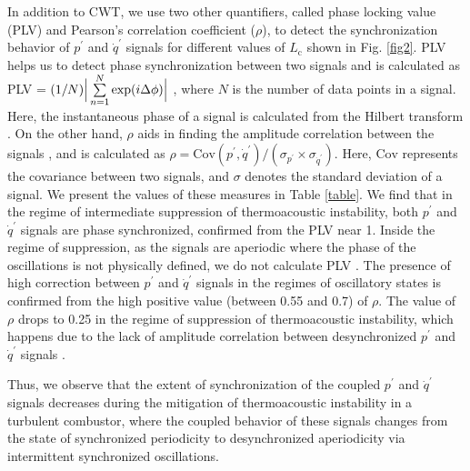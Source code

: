 \documentclass[twocolumn,10pt]{article} %
\begin{document}
In addition to CWT, we use two other quantifiers, called phase locking value (PLV) and Pearson's correlation coefficient ($\rho$), to detect the synchronization behavior of $p^{\prime}$ and $\dot{q}^{\prime}$ signals for different values of $L_{\text{c}}$ shown in Fig. \ref{fig2}. PLV helps us to detect phase synchronization between two signals and is calculated as PLV = $(1/N) \Big{\lvert} \sum\limits_{n=1}^N \text{exp}(i \Delta \phi) \Big{\lvert}$ \cite{pikovsky2003synchronization}, where $N$ is the number of data points in a signal. Here, the instantaneous phase of a signal is calculated from the Hilbert transform \cite{pikovsky2003synchronization}. On the other hand, $\rho$ aids in finding the amplitude correlation between the signals \cite{gonzalez2002amplitude}, and is calculated as $\rho = \text{Cov}(p^{\prime},\dot{q}^{\prime})/(\sigma_{p^{\prime}} \times \sigma_{\dot{q}^{\prime}})$. Here, $\text{Cov}$ represents the covariance between two signals, and $\sigma$ denotes the standard deviation of a signal. We present the values of these measures in Table \ref{table}. We find that in the regime of intermediate suppression of thermoacoustic instability, both $p^{\prime}$ and $\dot{q}^{\prime}$ signals are phase synchronized, confirmed from the PLV near 1. Inside the regime of suppression, as the signals are aperiodic where the phase of the oscillations is not physically defined, we do not calculate PLV \cite{pikovsky2003synchronization,sujith2021thermoacoustic}. The presence of high correction between $p^{\prime}$ and $\dot{q}^{\prime}$ signals  in the regimes of oscillatory states is confirmed from the high positive value (between 0.55 and 0.7) of $\rho$. The value of $\rho$ drops to 0.25 in the regime of suppression of thermoacoustic instability, which happens due to the lack of amplitude correlation between desynchronized $p^{\prime}$ and $\dot{q}^{\prime}$ signals \cite{pawar2017thermoacoustic}.   

Thus, we observe that the extent of synchronization of the coupled $p^{\prime}$ and $\dot{q}^{\prime}$ signals decreases during the mitigation of thermoacoustic instability in a turbulent combustor, where the coupled behavior of these signals changes from the state of synchronized periodicity to desynchronized aperiodicity via intermittent synchronized oscillations.
\end{document}
